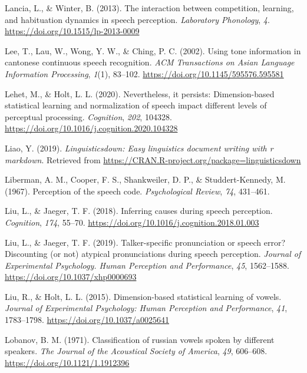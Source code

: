 \documentclass[
  11pt,
  english,
  man,floatsintext]{apa6}
\newlength{\cslhangindent}
\newlength{\cslentryspacingunit} %
\newenvironment{CSLReferences}[2] %
 {%
  \setlength{\parindent}{0pt}
  \ifodd #1
  \let\oldpar\par
  \def\par{\hangindent=\cslhangindent\oldpar}
  \fi
  \setlength{\parskip}{#2\cslentryspacingunit}
 }%
 {}
\begin{document}
\begin{CSLReferences}{1}{0}
\leavevmode{}%
Lancia, L., \& Winter, B. (2013). The interaction between competition, learning, and habituation dynamics in speech perception. \emph{Laboratory Phonology}, \emph{4}. \url{https://doi.org/10.1515/lp-2013-0009}

\leavevmode{}%
Lee, T., Lau, W., Wong, Y. W., \& Ching, P. C. (2002). Using tone information in cantonese continuous speech recognition. \emph{ACM Transactions on Asian Language Information Processing}, \emph{1}(1), 83--102. \url{https://doi.org/10.1145/595576.595581}

\leavevmode{}%
Lehet, M., \& Holt, L. L. (2020). Nevertheless, it persists: Dimension-based statistical learning and normalization of speech impact different levels of perceptual processing. \emph{Cognition}, \emph{202}, 104328. \url{https://doi.org/10.1016/j.cognition.2020.104328}

\leavevmode{}%
Liao, Y. (2019). \emph{Linguisticsdown: Easy linguistics document writing with r markdown}. Retrieved from \url{https://CRAN.R-project.org/package=linguisticsdown}

\leavevmode{}%
Liberman, A. M., Cooper, F. S., Shankweiler, D. P., \& Studdert-Kennedy, M. (1967). Perception of the speech code. \emph{Psychological Review}, \emph{74}, 431--461.

\leavevmode{}%
Liu, L., \& Jaeger, T. F. (2018). Inferring causes during speech perception. \emph{Cognition}, \emph{174}, 55--70. \url{https://doi.org/10.1016/j.cognition.2018.01.003}

\leavevmode{}%
Liu, L., \& Jaeger, T. F. (2019). Talker-specific pronunciation or speech error? Discounting (or not) atypical pronunciations during speech perception. \emph{Journal of Experimental Psychology. Human Perception and Performance}, \emph{45}, 1562--1588. \url{https://doi.org/10.1037/xhp0000693}

\leavevmode{}%
Liu, R., \& Holt, L. L. (2015). Dimension-based statistical learning of vowels. \emph{Journal of Experimental Psychology: Human Perception and Performance}, \emph{41}, 1783--1798. \url{https://doi.org/10.1037/a0025641}

\leavevmode{}%
Lobanov, B. M. (1971). Classification of russian vowels spoken by different speakers. \emph{The Journal of the Acoustical Society of America}, \emph{49}, 606--608. \url{https://doi.org/10.1121/1.1912396}


\end{CSLReferences}
\end{document}
